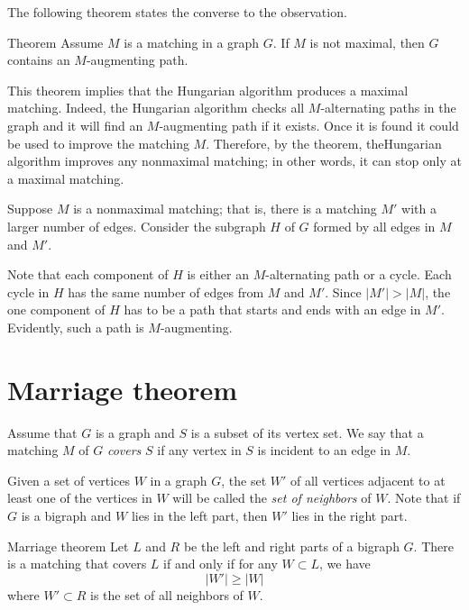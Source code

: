 The following theorem states the converse to the observation.

\begin{thm}{Theorem}
Assume $M$ is a matching in a graph $G$.
If $M$ is not maximal, then $G$ contains an $M$-augmenting path.
\end{thm}

This theorem implies that the Hungarian algorithm \cite[Section 7.2]{hartsfield-ringel} produces a maximal matching.
Indeed, the Hungarian algorithm checks all $M$-alternating paths in the graph and it will find an $M$-augmenting path if it exists.
Once it is found it could be used to improve the matching $M$.
Therefore, by the theorem, theHungarian algorithm improves any nonmaximal matching;
in other words, it can stop only at a maximal matching.

Suppose $M$ is a nonmaximal matching; that is, there is a matching $M'$ with a larger number of edges.
Consider the subgraph $H$ of $G$ formed by all edges in $M$ and $M'$.

Note that each component of $H$ is either an $M$-alternating path or a cycle.
Each cycle in $H$ has the same number of edges from $M$ and $M'$.
Since $|M'|>|M|$, the one component of $H$ has to be a path that starts and ends with an edge in $M'$. 
Evidently, such a path is $M$-augmenting.
\qeds

\section{Marriage theorem}

Assume that $G$ is a graph and $S$ is a subset of its vertex set.
We say that a matching $M$ of $G$ {}\emph{covers} $S$ if any vertex in $S$ is incident to an edge in $M$.

Given a set of vertices $W$ in a graph $G$, the set $W'$ of all vertices adjacent to at least one of the vertices in $W$ will be called the \emph{set of neighbors} of $W$.
Note that if $G$ is a bigraph and $W$ lies in the left part, then $W'$ lies in the right part. 

\begin{thm}{Marriage theorem}\label{thm:marriage}
Let $L$ and $R$ be the left and right parts of a bigraph $G$.
There is a matching that covers $L$ if and only if for any $W\subset L$, we have 
\[|W'|\ge |W|\]
where $W'\subset R$ is the set of all neighbors of $W$.

\end{thm}


